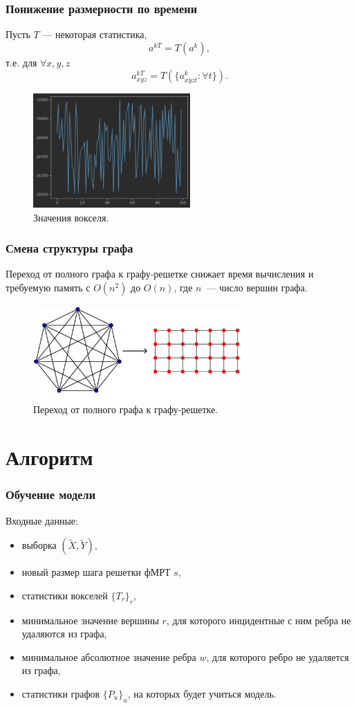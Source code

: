 \documentclass{beamer}
\begin{document}
	\begin{frame} 
		\frametitle{Понижение размерности по времени}
		Пусть $T$ --- некоторая статистика,
		\[
		a^{kT} = T(a^k),
		\]
		т.е. для $\forall x, y, z$
		\[
		a^{kT}_{xyz} = T(\{a_{xyzt}^k : \forall t\}).
		\]
		
		\begin{figure}
			\includegraphics[width=6cm]{../images/time_series.png}
			\caption{Значения вокселя.} 
			\label{fg:11}
		\end{figure}	
	\end{frame}	

	\begin{frame} 
		\frametitle{Смена структуры графа}
		
		Переход от полного графа к графу-решетке снижает время вычисления и требуемую память с $O(n^2)$ до $O(n)$, где $n$~--- число вершин графа.
		
		\vspace{0.5cm}
						
		\begin{figure}
			\includegraphics[width=8cm]{../images/full_grid_graphs_1.pdf}
			\caption{Переход от полного графа к графу-решетке.} 
			\label{fg:9}
		\end{figure}			
	\end{frame}	

	\section{Алгоритм}
	\begin{frame} 
		\frametitle{Обучение модели}
		Входные данные:
		\begin{itemize}
			\item выборка $(\widetilde{X}, \widetilde{Y})$,
			\item новый размер шага решетки фМРТ $s$,
			\item статистики вокселей $\{T_r\}_r$,
			\item минимальное значение вершины $r$, для которого инцидентные с ним ребра не удаляются из графа,
			\item минимальное абсолютное значение ребра $w$, для которого ребро не удаляется из графа,
			\item статистики графов $\{P_u\}_u$, на которых будет учиться модель.
		\end{itemize}
	\end{frame}
\end{document}
